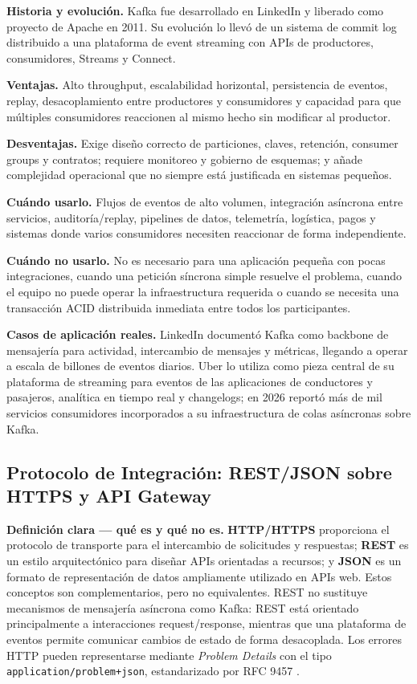 \documentclass[12pt,a4paper]{article}
\begin{document}
\textbf{Historia y evolución.} Kafka fue desarrollado en LinkedIn y liberado como proyecto de Apache en 2011. Su evolución lo llevó de un sistema de commit log distribuido a una plataforma de event streaming con APIs de productores, consumidores, Streams y Connect. \cite{linkedin-kafka,kafka-intro}

\textbf{Ventajas.} Alto throughput, escalabilidad horizontal, persistencia de eventos, replay, desacoplamiento entre productores y consumidores y capacidad para que múltiples consumidores reaccionen al mismo hecho sin modificar al productor.

\textbf{Desventajas.} Exige diseño correcto de particiones, claves, retención, consumer groups y contratos; requiere monitoreo y gobierno de esquemas; y añade complejidad operacional que no siempre está justificada en sistemas pequeños.

\textbf{Cuándo usarlo.} Flujos de eventos de alto volumen, integración asíncrona entre servicios, auditoría/replay, pipelines de datos, telemetría, logística, pagos y sistemas donde varios consumidores necesiten reaccionar de forma independiente.

\textbf{Cuándo no usarlo.} No es necesario para una aplicación pequeña con pocas integraciones, cuando una petición síncrona simple resuelve el problema, cuando el equipo no puede operar la infraestructura requerida o cuando se necesita una transacción ACID distribuida inmediata entre todos los participantes.

\textbf{Casos de aplicación reales.} LinkedIn documentó Kafka como backbone de mensajería para actividad, intercambio de mensajes y métricas, llegando a operar a escala de billones de eventos diarios. Uber lo utiliza como pieza central de su plataforma de streaming para eventos de las aplicaciones de conductores y pasajeros, analítica en tiempo real y changelogs; en 2026 reportó más de mil servicios consumidores incorporados a su infraestructura de colas asíncronas sobre Kafka. \cite{linkedin-kafka-scale,uber-kafka,uber-kafka-2026}


\subsection{Protocolo de Integración: REST/JSON sobre HTTPS y API Gateway}

\textbf{Definición clara --- qué es y qué no es.} \textbf{HTTP/HTTPS} proporciona el protocolo de transporte para el intercambio de solicitudes y respuestas; \textbf{REST} es un estilo arquitectónico para diseñar APIs orientadas a recursos; y \textbf{JSON} es un formato de representación de datos ampliamente utilizado en APIs web. Estos conceptos son complementarios, pero no equivalentes. REST no sustituye mecanismos de mensajería asíncrona como Kafka: REST está orientado principalmente a interacciones request/response, mientras que una plataforma de eventos permite comunicar cambios de estado de forma desacoplada. Los errores HTTP pueden representarse mediante \textit{Problem Details} con el tipo \texttt{application/problem+json}, estandarizado por RFC 9457 \cite{rfc9457}.
\end{document}
